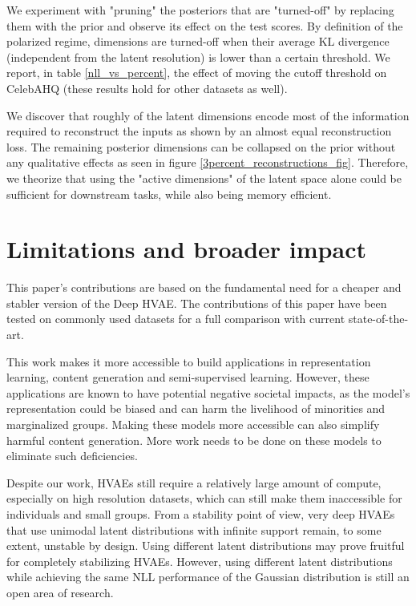 \documentclass{article}
\begin{document}
We experiment with "pruning" the posteriors that are "turned-off" by replacing them with the prior and observe its effect on the test scores. By definition of the polarized regime\cite{rolinek2019variational}, dimensions are turned-off when their average KL divergence (independent from the latent resolution) is lower than a certain threshold. We report, in table \ref{nll_vs_percent}, the effect of moving the cutoff threshold on CelebAHQ  (these results hold for other datasets as well). 

We discover that roughly  of the latent dimensions encode most of the information required to reconstruct the inputs as shown by an almost equal reconstruction loss. The remaining  posterior dimensions can be collapsed on the prior without any qualitative effects as seen in figure \ref{3percent_reconstructions_fig}. Therefore, we theorize that using the "active dimensions" of the latent space alone could be sufficient for downstream tasks, while also being memory efficient.

\section{Limitations and broader impact}
\label{broader_impact}

This paper's contributions are based on the fundamental need for a cheaper and stabler version of the Deep HVAE. The contributions of this paper have been tested on commonly used datasets for a full comparison with current state-of-the-art.

This work makes it more accessible to build applications in representation learning, content generation and semi-supervised learning. However, these applications are known to have potential negative societal impacts, as the model's representation could be biased and can harm the livelihood of minorities and marginalized groups. Making these models more accessible can also simplify harmful content generation. More work needs to be done on these models to eliminate such deficiencies.

Despite our work, HVAEs still require a relatively large amount of compute, especially on high resolution datasets, which can still make them inaccessible for individuals and small groups. From a stability point of view, very deep HVAEs that use unimodal latent distributions with infinite support remain, to some extent, unstable by design. Using different latent distributions \cite{impact1, impact2, impact3, impact4} may prove fruitful for completely stabilizing HVAEs. However, using different latent distributions while achieving the same NLL performance of the Gaussian distribution is still an open area of research.
\end{document}
